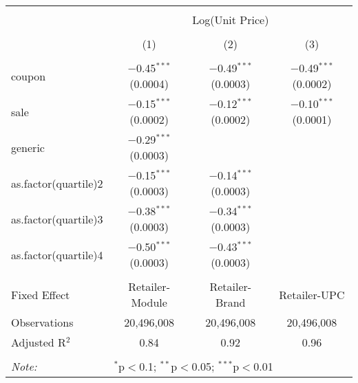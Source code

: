 
\begin{table}[!htbp] \centering 
  \caption{} 
  \label{tab:overallSavingsNonStorable} 
\begin{tabular}{@{\extracolsep{5pt}}lccc} 
\\[-1.8ex]\hline 
\hline \\[-1.8ex] 
 & \multicolumn{3}{c}{Log(Unit Price)} \\ 
\\[-1.8ex] & (1) & (2) & (3)\\ 
\hline \\[-1.8ex] 
 coupon & $-$0.45$^{***}$ (0.0004) & $-$0.49$^{***}$ (0.0003) & $-$0.49$^{***}$ (0.0002) \\ 
  sale & $-$0.15$^{***}$ (0.0002) & $-$0.12$^{***}$ (0.0002) & $-$0.10$^{***}$ (0.0001) \\ 
  generic & $-$0.29$^{***}$ (0.0003) &  &  \\ 
  as.factor(quartile)2 & $-$0.15$^{***}$ (0.0003) & $-$0.14$^{***}$ (0.0003) &  \\ 
  as.factor(quartile)3 & $-$0.38$^{***}$ (0.0003) & $-$0.34$^{***}$ (0.0003) &  \\ 
  as.factor(quartile)4 & $-$0.50$^{***}$ (0.0003) & $-$0.43$^{***}$ (0.0003) &  \\ 
 \hline \\[-1.8ex] 
Fixed Effect & Retailer-Module & Retailer-Brand & Retailer-UPC \\ 
Observations & 20,496,008 & 20,496,008 & 20,496,008 \\ 
Adjusted R$^{2}$ & 0.84 & 0.92 & 0.96 \\ 
\hline 
\hline \\[-1.8ex] 
\textit{Note:}  & \multicolumn{3}{l}{$^{*}$p$<$0.1; $^{**}$p$<$0.05; $^{***}$p$<$0.01} \\ 
\end{tabular} 
\end{table} 
